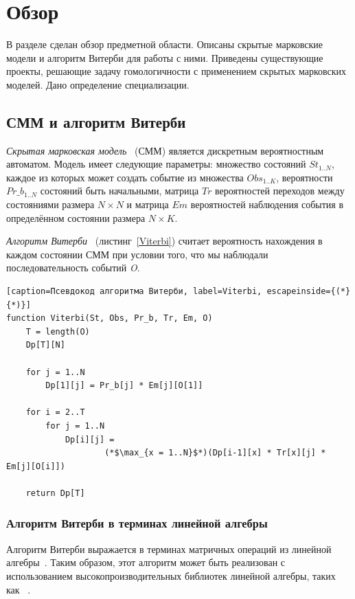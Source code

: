\section{Обзор}
В разделе сделан обзор предметной области.
Описаны скрытые марковские модели и алгоритм Витерби для работы с ними.
Приведены существующие проекты, решающие задачу гомологичности с применением скрытых марковских моделей.
Дано определение специализации.


\subsection{СММ и алгоритм Витерби}
\label{HMM_Vit}
\emph{Скрытая марковская модель}~\cite{Eddy_CHMM} (СММ) 
является дискретным вероятностным автоматом.
Модель имеет следующие параметры: множество состояний $St_{1..N}$, 
каждое из которых может создать событие из множества
$Obs_{1..K}$, вероятности $Pr\_b_{1..N}$ состояний быть
начальными, матрица $Tr$ вероятностей переходов между состояниями размера $N
\times N$ и матрица $Em$ вероятностей наблюдения события в определённом 
состоянии размера ${N \times K}$.

\emph{Алгоритм Витерби}~\cite{Viterbi}
(листинг~\ref{Viterbi}) считает вероятность нахождения в 
каждом состоянии СММ при условии того, что мы наблюдали последовательность событий \emph{O}.

\begin{lstlisting}[caption=Псевдокод алгоритма Витерби, label=Viterbi, escapeinside={(*}{*)}]
function Viterbi(St, Obs, Pr_b, Tr, Em, O)
	T = length(O)
	Dp[T][N]

	for j = 1..N
		Dp[1][j] = Pr_b[j] * Em[j][O[1]]
	
	for i = 2..T
		for j = 1..N
			Dp[i][j] = 
					(*$\max_{x = 1..N}$*)(Dp[i-1][x] * Tr[x][j] * Em[j][O[i]])

	return Dp[T]
\end{lstlisting}


\subsubsection{Алгоритм Витерби в терминах линейной алгебры}
\label{LA_Viterbi_review}
Алгоритм Витерби выражается в терминах матричных 
операций из линейной алгебры~\cite{LA_Viterbi}.
Таким образом, этот алгоритм может быть реализован с 
использованием высокопроизводительных библиотек линейной 
алгебры, таких как
~\cite{SuiteSparse}.

